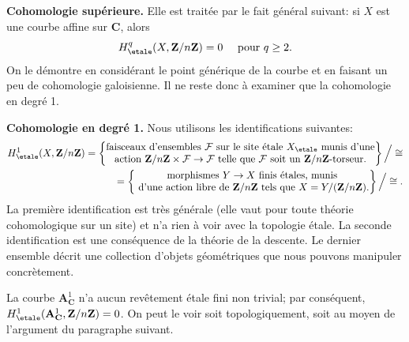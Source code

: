 \medskip\noindent
{\bf Cohomologie sup\'erieure.} Elle est trait\'ee par le fait g\'en\'eral suivant:
si $X$ est une courbe affine sur $\mathbf{C}$, alors
$$
H_\etale^q (X, \mathbf{Z}/n\mathbf{Z}) = 0 \quad \text{ pour } q \geq 2.
$$
On le d\'emontre en consid\'erant le point g\'en\'erique de la courbe et en faisant
un peu de cohomologie galoisienne. Il ne reste donc \`a examiner que la
cohomologie en degr\'e 1.

\medskip\noindent
{\bf Cohomologie en degr\'e 1.} Nous utilisons les identifications suivantes:
\begin{eqnarray*}
H_\etale^1 (X, \mathbf{Z}/n\mathbf{Z}) = \left\{
\begin{matrix}
\text{faisceaux d'ensembles }\mathcal{F}\text{ sur le site \'etale }X_\etale
\text{ munis d'une} \\
\text{action }\mathbf{Z}/n\mathbf{Z} \times \mathcal{F} \to \mathcal{F}
\text{ telle que }\mathcal{F}\text{ soit un }\mathbf{Z}/n\mathbf{Z}\text{-torseur.}
\end{matrix}
\right\}
\Big/ \cong
\\
 = \left\{
\begin{matrix}
\text{morphismes }Y \to X\text{ finis \'etales, munis} \\
\text{ d'une action libre de }\mathbf{Z}/n\mathbf{Z}\text{ tels que }
X = Y/(\mathbf{Z}/n\mathbf{Z}).
\end{matrix}
\right\}
\Big/ \cong.
\end{eqnarray*}
La premi\`ere identification est tr\`es g\'en\'erale (elle vaut pour toute th\'eorie
cohomologique sur un site) et n'a rien \`a voir avec la topologie \'etale. La
seconde identification est une cons\'equence de la th\'eorie de la descente. Le
dernier ensemble d\'ecrit une collection d'objets g\'eom\'etriques que nous pouvons
manipuler concr\`etement.

\medskip\noindent
La courbe $\mathbf{A}^1_\mathbf{C}$ n'a aucun rev\^etement \'etale fini non
trivial; par cons\'equent,
$H_\etale^1 (\mathbf{A}^1_\mathbf{C}, \mathbf{Z}/n\mathbf{Z}) = 0$.
On peut le voir soit topologiquement, soit au moyen de l'argument du paragraphe
suivant.

